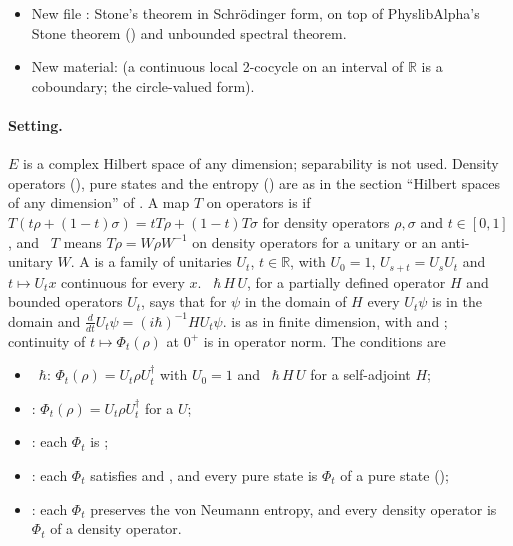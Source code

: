 \documentclass[11pt]{article}
\begin{document}
\begin{itemize}
  groups, and Bargmann's theorem for $\mathbb{R}$, the lift of a continuous evolution by unitary or
  anti-unitary conjugations to a strongly continuous unitary group.
\item New file : Stone's theorem in Schr\"odinger form,
  on top of PhyslibAlpha's Stone theorem
  ()
  and unbounded spectral theorem.
\item New  material:
   (a continuous local
  2-cocycle on an interval of $\mathbb{R}$ is a coboundary; the circle-valued form).
\end{itemize}

\paragraph{Setting.} $E$ is a complex Hilbert space of any dimension; separability is not used.
Density operators (), pure states and the entropy
() are as in the section ``Hilbert spaces of any dimension'' of
. A map $T$ on
operators is  if $T(t\rho + (1-t)\sigma) = tT\rho + (1-t)T\sigma$
for density operators $\rho, \sigma$ and $t \in [0,1]$, and
~$T$ means $T\rho = W\rho W^{-1}$ on density operators for a
unitary or an anti-unitary $W$. A  is a family of unitaries
$U_t$, $t \in \mathbb{R}$, with $U_0 = 1$, $U_{s+t} = U_sU_t$ and $t \mapsto U_t x$ continuous for
every $x$. ~$\hbar\,H\,U$, for a partially defined operator $H$ and bounded
operators $U_t$, says that for $\psi$ in the domain of $H$ every $U_t\psi$ is in the domain and
$\frac{d}{dt}U_t\psi = (i\hbar)^{-1}HU_t\psi$.  is as in finite dimension, with
 and ; continuity of
$t \mapsto \Phi_t(\rho)$ at $0^+$ is in operator norm. The conditions are
\begin{itemize}
\item {}~$\hbar$: $\Phi_t(\rho) = U_t\rho U_t^\dagger$ with $U_0 = 1$ and
  ~$\hbar\,H\,U$ for a self-adjoint $H$;
\item {}: $\Phi_t(\rho) = U_t\rho U_t^\dagger$ for a
   $U$;
\item {}: each $\Phi_t$ is ;
\item {}: each $\Phi_t$ satisfies  and , and every
  pure state is $\Phi_t$ of a pure state ();
\item {}: each $\Phi_t$ preserves the von Neumann entropy, and every density operator
  is $\Phi_t$ of a density operator.
\end{itemize}
\end{document}
